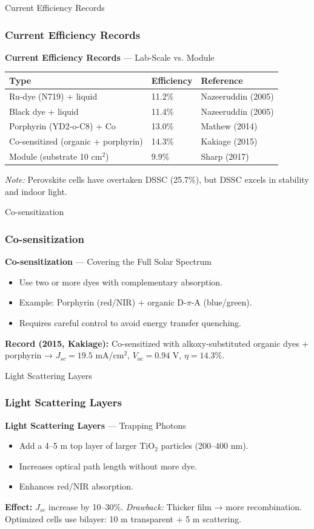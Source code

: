 \documentclass[aspectratio=169]{beamer}
\begin{document}
\begin{frame}{Current Efficiency Records}
\frametitle{Current Efficiency Records}

\textbf{Current Efficiency Records} — Lab-Scale vs. Module
\begin{table}
\centering
\begin{tabular}{lll}
\toprule
Type & Efficiency & Reference \\
\midrule
Ru-dye (N719) + liquid & 11.2\% & Nazeeruddin (2005) \\
Black dye + liquid & 11.4\% & Nazeeruddin (2005) \\
Porphyrin (YD2-o-C8) + Co & 13.0\% & Mathew (2014) \\
Co-sensitized (organic + porphyrin) & 14.3\% & Kakiage (2015) \\
Module (substrate 10 cm$^2$) & 9.9\% & Sharp (2017) \\
\bottomrule
\end{tabular}
\end{table}
\textit{Note:} Perovskite cells have overtaken DSSC (25.7\%), but DSSC excels in stability and indoor light.
\cite{Green2022}
\end{frame}


\begin{frame}{Co-sensitization}
\frametitle{Co-sensitization}

\textbf{Co-sensitization} — Covering the Full Solar Spectrum
\begin{itemize}
\item Use two or more dyes with complementary absorption.
\item Example: Porphyrin (red/NIR) + organic D-$\pi$-A (blue/green).
\item Requires careful control to avoid energy transfer quenching.
\end{itemize}
\textbf{Record (2015, Kakiage):} Co-sensitized with alkoxy-substituted organic dyes + porphyrin → $J_{sc} = 19.5$ mA/cm$^2$, $V_{oc}=0.94$ V, $\eta=14.3\%$.
\cite{Kakiage2015}
\end{frame}


\begin{frame}{Light Scattering Layers}
\frametitle{Light Scattering Layers}

\textbf{Light Scattering Layers} — Trapping Photons
\begin{itemize}
\item Add a 4–5 \textmu m top layer of larger TiO$_2$ particles (200–400 nm).
\item Increases optical path length without more dye.
\item Enhances red/NIR absorption.
\end{itemize}
\textbf{Effect:} $J_{sc}$ increase by 10–30\%.
\vspace{2mm}
\textit{Drawback:} Thicker film → more recombination. Optimized cells use bilayer: 10 \textmu m transparent + 5 \textmu m scattering.
\cite{Hore2005}
\end{frame}
\end{document}
